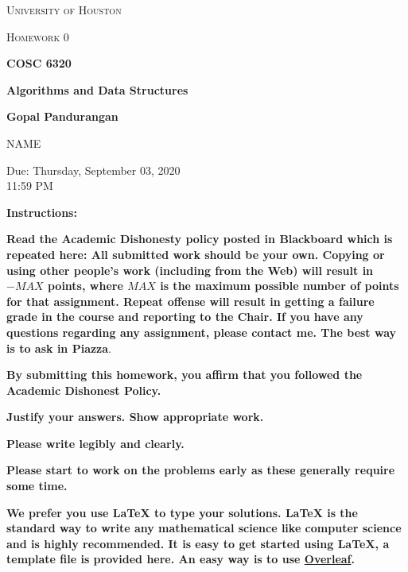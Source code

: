 \documentclass[a4paper]{article}
\begin{document}
\begin{titlepage}
    \begin{center}
        {\scshape\LARGE University of Houston\par}
        \vspace{1cm}
        {\scshape\Large Homework 0 \par}
        \vspace{1.5cm}
        {\huge\bfseries COSC 6320 \par}
        {\huge\bfseries Algorithms and Data Structures \par}
        \vspace{0.5cm}
        {\large\bfseries Gopal Pandurangan\par}
        \vspace{2cm}
        {\Large NAME\par}
        \vspace{0.5cm}
        {\large \par} Due: Thursday, September 03, 2020\\11:59 PM
    \end{center}

    \textbf{Instructions:}

    \textbf{Read the Academic Dishonesty policy posted in Blackboard which is repeated here:
        All submitted work should be  your own. Copying or using other people's work (including  from the Web) will result in $-MAX$ points, where $MAX$ is the maximum possible number of points for that assignment. Repeat offense will result in getting a failure grade in the course and reporting to the Chair. If you have any questions regarding any assignment, please contact me. The best way is to ask in Piazza}.


    \textbf{By submitting this homework, you affirm that you followed the Academic Dishonest Policy.}

    \textbf{Justify your answers. Show appropriate work.}

    \textbf{Please write legibly and clearly.}

    \textbf{Please start to work on the problems early as these generally require some time.}

    \textbf{We prefer you use LaTeX to type your solutions. LaTeX is the standard way to write any mathematical science like
        computer science and is highly recommended. It is easy to get started using LaTeX, a template file is provided here.
        An easy way is to use \href{https://www.overleaf.com/}{Overleaf}.}


\end{titlepage}
\end{document}
